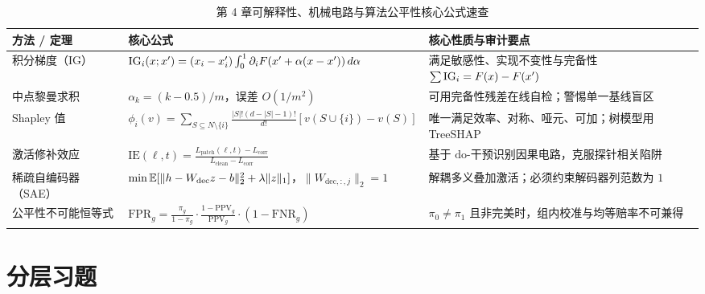\begin{table}[htbp]
  \centering
  \caption{第 4 章可解释性、机械电路与算法公平性核心公式速查}
  \label{tab:ch4-summary}
  \footnotesize
  \begin{tabularx}{\linewidth}{@{}p{33mm}p{62mm}X@{}}
    \toprule
    \textbf{方法 / 定理} & \textbf{核心公式} & \textbf{核心性质与审计要点} \\
    \midrule
    积分梯度（IG） & $\operatorname{IG}_i(x;x') = (x_i-x'_i)\int_0^1 \partial_i F(x'+\alpha(x-x'))\,d\alpha$ & 满足敏感性、实现不变性与完备性 $\sum \operatorname{IG}_i = F(x)-F(x')$ \\
    中点黎曼求积 & $\alpha_k = (k-0.5)/m$，误差 $O(1/m^2)$ & 可用完备性残差在线自检；警惕单一基线盲区 \\
    Shapley 值 & $\phi_i(v) = \sum_{S\subseteq N\setminus\{i\}} \frac{|S|!(d-|S|-1)!}{d!}[v(S\cup\{i\})-v(S)]$ & 唯一满足效率、对称、哑元、可加；树模型用 TreeSHAP \\
    激活修补效应 & $\mathrm{IE}(\ell,t) = \frac{L_{\text{patch}}(\ell,t)-L_{\text{corr}}}{L_{\text{clean}}-L_{\text{corr}}}$ & 基于 $\mathrm{do}$-干预识别因果电路，克服探针相关陷阱 \\
    稀疏自编码器（SAE） & $\min \mathbb{E}[\|h - W_{\text{dec}}z - b\|_2^2 + \lambda\|z\|_1]$，$\|W_{\text{dec},:,j}\|_2=1$ & 解耦多义叠加激活；必须约束解码器列范数为 $1$ \\
    公平性不可能恒等式 & $\mathrm{FPR}_g = \frac{\pi_g}{1-\pi_g}\cdot\frac{1-\mathrm{PPV}_g}{\mathrm{PPV}_g}\cdot(1-\mathrm{FNR}_g)$ & $\pi_0 \neq \pi_1$ 且非完美时，组内校准与均等赔率不可兼得 \\
    \bottomrule
  \end{tabularx}
\end{table}

\section{分层习题}


